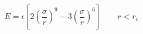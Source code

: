 


$$
  E = \epsilon \left[ 2 \left(\frac{\sigma}{r}\right)^9 - 
    3 \left(\frac{\sigma}{r}\right)^6 \right]
  \qquad r < r_c
$$

